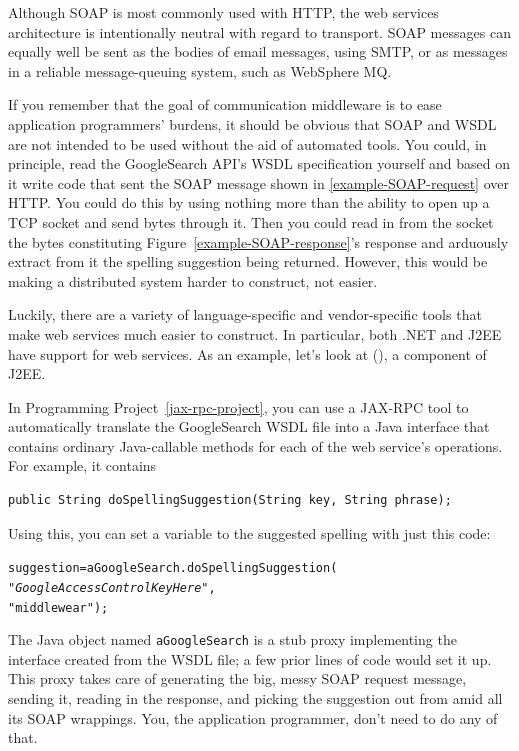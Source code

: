 Although SOAP is most commonly used with HTTP, the web services
architecture is intentionally neutral with regard to transport.  SOAP
messages can equally well be sent as the bodies of email messages,
using SMTP, or as messages in a reliable message-queuing system, such
as WebSphere MQ.

If you remember that the goal of communication middleware is to ease
application programmers' burdens, it should be obvious that SOAP and
WSDL are not intended to be used without the aid of automated tools.
You could, in principle, read the GoogleSearch API's WSDL specification
yourself and based on it write code that sent the SOAP message
shown in \ref{example-SOAP-request} over HTTP.  You could do this by using nothing more than
the ability to open up a TCP socket and send bytes through it. Then
you could read in from the socket the bytes constituting
Figure~\ref{example-SOAP-response}'s response and arduously extract
from it the spelling suggestion being returned.  However, this would
be making a distributed system harder to construct, not easier.

Luckily, there are a variety of language-specific and vendor-specific
tools that make web services much easier to construct.  In particular,
both .NET and J2EE have support for web services.  As an example, let's
look at  (), a component of
J2EE.

In Programming Project~\ref{jax-rpc-project}, you can use a JAX-RPC
tool to automatically translate the
GoogleSearch WSDL file into a Java interface that contains
ordinary Java-callable methods for each of the web service's
operations.  For example, it contains
\begin{verbatim}
public String doSpellingSuggestion(String key, String phrase);
\end{verbatim}
Using this, you can set a variable to the suggested spelling with
just this code:
\begin{alltt}
suggestion = aGoogleSearch.doSpellingSuggestion(
                           "\textrm{\textit{GoogleAccessControlKeyHere}}",
                           "middlewear");
\end{alltt}
The Java object named \verb|aGoogleSearch| is a stub proxy
implementing the interface created from the WSDL file; a few prior
lines of code would set it up.  This proxy
takes care of generating the big, messy SOAP request message,
sending it, reading in the response, and picking the suggestion out
from amid all its SOAP wrappings.  You, the application programmer,
don't need to do any of that.

